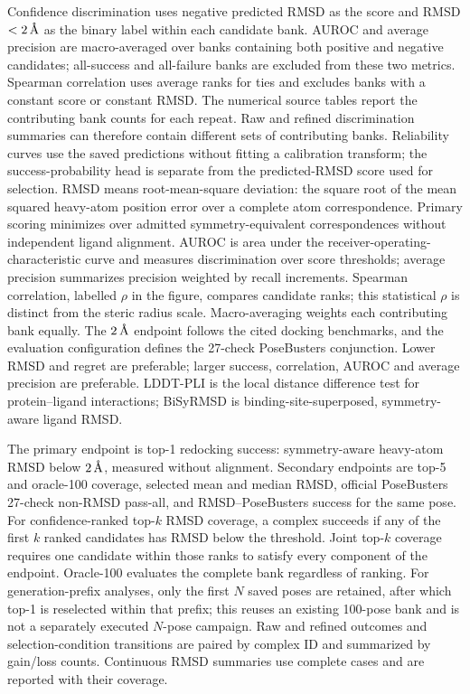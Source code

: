 \documentclass{article}
\newcommand{\angstrom}{\text{\normalfont\AA}}
\begin{document}
Confidence discrimination uses negative predicted RMSD as the score and RMSD \(<2\,\angstrom\) as the binary label within each candidate bank. AUROC and average precision are macro-averaged over banks containing both positive and negative candidates; all-success and all-failure banks are excluded from these two metrics. Spearman correlation uses average ranks for ties and excludes banks with a constant score or constant RMSD. The numerical source tables report the contributing bank counts for each repeat. Raw and refined discrimination summaries can therefore contain different sets of contributing banks. Reliability curves use the saved predictions without fitting a calibration transform; the success-probability head is separate from the predicted-RMSD score used for selection.
RMSD means root-mean-square deviation: the square root of the mean squared heavy-atom position error over a complete atom correspondence. Primary scoring minimizes over admitted symmetry-equivalent correspondences without independent ligand alignment. AUROC is area under the receiver-operating-characteristic curve and measures discrimination over score thresholds; average precision summarizes precision weighted by recall increments. Spearman correlation, labelled \(\rho\) in the figure, compares candidate ranks; this statistical \(\rho\) is distinct from the steric radius scale. Macro-averaging weights each contributing bank equally. The \(2\,\angstrom\) endpoint follows the cited docking benchmarks, and the evaluation configuration defines the 27-check PoseBusters conjunction. Lower RMSD and regret are preferable; larger success, correlation, AUROC and average precision are preferable. LDDT-PLI is the local distance difference test for protein--ligand interactions; BiSyRMSD is binding-site-superposed, symmetry-aware ligand RMSD.

The primary endpoint is top-1 redocking success: symmetry-aware heavy-atom RMSD below \(2\,\angstrom\), measured without alignment.
Secondary endpoints are top-5 and oracle-100 coverage, selected mean and median RMSD, official PoseBusters 27-check non-RMSD pass-all, and RMSD--PoseBusters success for the same pose.
For confidence-ranked top-$k$ RMSD coverage, a complex succeeds if any of the first $k$ ranked candidates has RMSD below the threshold. Joint top-$k$ coverage requires one candidate within those ranks to satisfy every component of the endpoint. Oracle-100 evaluates the complete bank regardless of ranking.
For generation-prefix analyses, only the first $N$ saved poses are retained, after which top-1 is reselected within that prefix; this reuses an existing 100-pose bank and is not a separately executed $N$-pose campaign.
Raw and refined outcomes and selection-condition transitions are paired by complex ID and summarized by gain/loss counts.
Continuous RMSD summaries use complete cases and are reported with their coverage.
\end{document}
